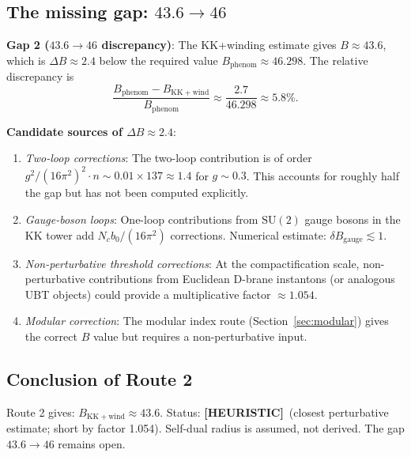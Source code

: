 \documentclass[12pt,a4paper]{article}
\theoremstyle{definition}
\theoremstyle{remark}
\newcommand{\heur}{\textcolor{orange!80!black}{\textbf{[HEURISTIC]}}}
\begin{document}
\subsection{The missing gap: $43.6 \to 46$}

\begin{gapbox}
\textbf{Gap 2 ($43.6 \to 46$ discrepancy)}: The KK+winding estimate gives
$B \approx 43.6$, which is $\Delta B \approx 2.4$ below the required value
$B_{\mathrm{phenom}} \approx 46.298$.  The relative discrepancy is
\[
  \frac{B_{\mathrm{phenom}} - B_{\mathrm{KK+wind}}}{B_{\mathrm{phenom}}}
  \approx \frac{2.7}{46.298} \approx 5.8\%.
\]

\textbf{Candidate sources of $\Delta B \approx 2.4$}:
\begin{enumerate}
  \item \textit{Two-loop corrections}: The two-loop contribution is of order
        $g^2/(16\pi^2)^2 \cdot n \sim 0.01 \times 137 \approx 1.4$ for
        $g \sim 0.3$.  This accounts for roughly half the gap but has not been
        computed explicitly.
  \item \textit{Gauge-boson loops}: One-loop contributions from $\mathrm{SU}(2)$
        gauge bosons in the KK tower add $N_c b_0/(16\pi^2)$ corrections.
        Numerical estimate: $\delta B_\mathrm{gauge} \lesssim 1$.
  \item \textit{Non-perturbative threshold corrections}: At the
        compactification scale, non-perturbative contributions from Euclidean
        D-brane instantons (or analogous UBT objects) could provide a
        multiplicative factor $\approx 1.054$.
  \item \textit{Modular correction}: The modular index route (Section~\ref{sec:modular})
        gives the correct $B$ value but requires a non-perturbative input.
\end{enumerate}
\end{gapbox}

\subsection{Conclusion of Route 2}

\begin{resultbox}
Route 2 gives: $B_{\mathrm{KK+wind}} \approx 43.6$.
Status: \heur\ (closest perturbative estimate; short by factor 1.054).
Self-dual radius is assumed, not derived.  The gap $43.6 \to 46$ remains open.
\end{resultbox}

\end{document}

